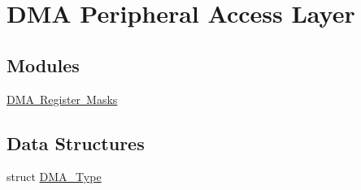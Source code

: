 \hypertarget{group___d_m_a___peripheral___access___layer}{}\section{D\+MA Peripheral Access Layer}
\label{group___d_m_a___peripheral___access___layer}
\subsection*{Modules}
\begin{DoxyCompactItemize}
\item 
\mbox{\hyperlink{group___d_m_a___register___masks}{D\+M\+A Register Masks}}
\end{DoxyCompactItemize}
\subsection*{Data Structures}
\begin{DoxyCompactItemize}
\item 
struct \mbox{\hyperlink{struct_d_m_a___type}{D\+M\+A\+\_\+\+Type}}
\end{DoxyCompactItemize}
